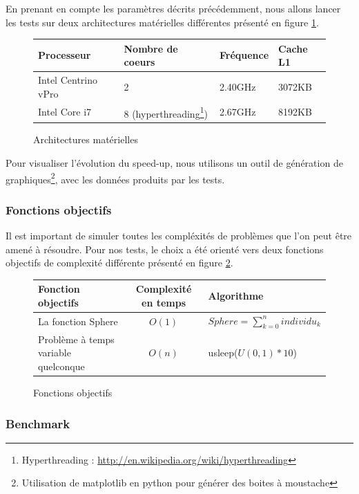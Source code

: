 En prenant en compte les paramètres décrits précédemment, nous allons lancer les tests sur deux architectures matérielles différentes présenté en figure \ref{fig:architectures}.\\

\begin{figure}[here]
  \centering
  \begin{tabular}{ | l | l | l | l |}
    \hline
    \textbf{Processeur} & \textbf{Nombre de coeurs} & \textbf{Fréquence} & \textbf{Cache L1}\\\hline
    Intel Centrino vPro & 2 & 2.40GHz & 3072KB\\\hline
    Intel Core i7 & 8 (hyperthreading\footnote{Hyperthreading : \url{http://en.wikipedia.org/wiki/hyperthreading}}) & 2.67GHz & 8192KB\\\hline
  \end{tabular}
  \caption{Architectures matérielles}
  \label{fig:architectures}
\end{figure}

Pour visualiser l'évolution du speed-up, nous utilisons un outil de génération de graphiques\footnote{Utilisation de matplotlib en python pour générer des boites à moustache}, avec les données produits par les tests.

\subsubsection{Fonctions objectifs}

Il est important de simuler toutes les compléxités de problèmes que l'on peut être amené à résoudre. Pour nos tests, le choix a été orienté vers deux fonctions objectifs de complexité différente présenté en figure \ref{fig:objectifs}.

\begin{figure}[here]
  \centering
  \begin{tabular}{ | l | c | l |}
    \hline
    \textbf{Fonction objectifs} & \textbf{Complexité en temps} & \textbf{Algorithme}\\\hline
    La fonction Sphere & $O(1)$ & $Sphere = \sum_{k=0}^n individu_k$\\\hline
    Problème à temps variable quelconque & $O(n)$ & usleep($U(0,1) * 10$)\\\hline
  \end{tabular}
  \caption{Fonctions objectifs}
  \label{fig:objectifs}
\end{figure}

\subsubsection{Benchmark}

